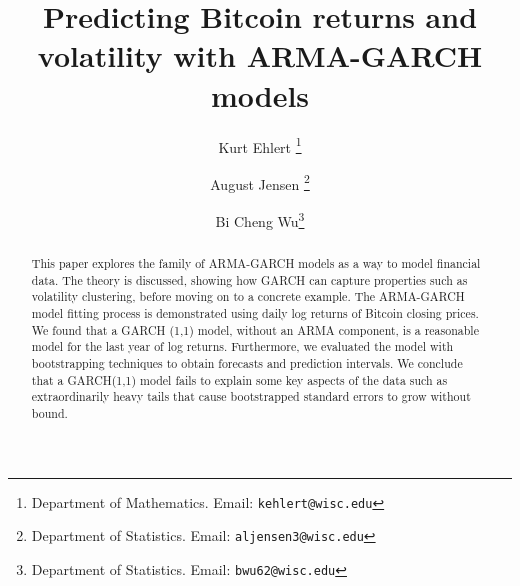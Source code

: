\documentclass[12pt]{article}
\begin{document}
\title{Predicting Bitcoin returns and volatility with ARMA-GARCH models}

\author{
Kurt Ehlert \thanks{Department of Mathematics.  Email: {\tt kehlert@wisc.edu}}  %
\and 
August Jensen \thanks{Department of Statistics.  Email: {\tt  aljensen3@wisc.edu}}  %
\and 
Bi Cheng Wu\thanks{Department of Statistics.  Email: {\tt  bwu62@wisc.edu}} %
}

\maketitle

\begin{abstract}











This paper explores the family of ARMA-GARCH models as a way to model financial data. The theory is discussed, showing how GARCH can capture properties such as volatility clustering, before moving on to a concrete example. The ARMA-GARCH model fitting process is demonstrated using daily log returns of Bitcoin closing prices. We found that a GARCH (1,1) model, without an ARMA component, is a reasonable model for the last year of log returns. Furthermore, we evaluated the model with bootstrapping techniques to obtain forecasts and prediction intervals. We conclude that a GARCH(1,1) model fails to explain some key aspects of the data such as extraordinarily heavy tails that cause bootstrapped standard errors to grow without bound.
\end{abstract}
\end{document}
